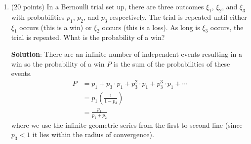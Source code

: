 \documentclass[12pt]{article}
\newenvironment{solution}{
\begin{mdframed}
  { {\bfseries Solution}: }}{
\end{mdframed}}
\begin{document}
\begin{enumerate}
\begin{solution}
\begin{enumerate}[label=({\alph*})]
        \item We start by factoring the advancement operator equation:
        \begin{equation*}
          (A^{2} - 11 A + 28) f(n) = (A - 7) (A - 4) f(n)
        \end{equation*}
        Then using the general theorem we know that the general form of solutions to the equation is:
        \begin{align*}
          f(n) = c_{1} 7^{n} + c_{2} 4^{n}
        \end{align*}
        Now we use the initial conditions to set up a system of equations.
        \begin{gather*}
          c_{1} + c_{2} = -2 \\
          7 c_{1} + 4 c_{2} = 1
        \end{gather*}
        Using elimination, we find that
        \begin{align*}
          3 c_{1} &= 9 \\
          \implies c_{1} &= 3
        \end{align*}
        Substituting this back into the top equation yields
        \(c_{2} = -5\).
        Therefore, the solution to the advancement operator equation is
        \begin{equation*}
          f(n) = 3 \cdot 7^{n} - 5 \cdot 4^{n}
        \end{equation*}
      \end{enumerate}
    \end{solution}

    \pagebreak

    \item (20 points) In a Bernoulli trial set up, there are three outcomes \(\xi_{1}\), \(\xi_{2}\), and \(\xi_{3}\) with probabilities \(p_{1}\), \(p_{2}\), and \(p_{3}\) respectively.
    The trial is repeated until either \(\xi_{1}\) occurs (this is a win) or \(\xi_{2}\) occurs (this is a loss).
    As long is \(\xi_{3}\) occurs, the trial is repeated. What is the probability of a win?

    \begin{solution}
      There are an infinite number of independent events resulting in a win so the probability of a win \(P\) is the sum of the probabilities of these events.
      \begin{align*}
        P &= p_{1} + p_{3} \cdot p_{1} + p_{3}^{2} \cdot p_{1} + p_{3}^{3} \cdot p_{1} + \cdots \\
        &= p_{1} \left(\frac{1}{1 - p_{3}}\right) \\
        &= \frac{p_{1}}{p_{1} + p_{2}}
      \end{align*}
      where we use the infinite geometric series from the first to second line (since \(p_{3} < 1\) it lies within the radius of convergence).
    \end{solution}


\end{enumerate}
\end{document}
